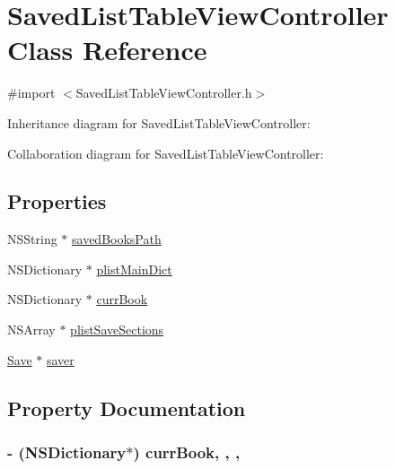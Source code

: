 \hypertarget{interface_saved_list_table_view_controller}{}\section{Saved\+List\+Table\+View\+Controller Class Reference}
\label{interface_saved_list_table_view_controller}


{\ttfamily \#import $<$Saved\+List\+Table\+View\+Controller.\+h$>$}



Inheritance diagram for Saved\+List\+Table\+View\+Controller\+:


Collaboration diagram for Saved\+List\+Table\+View\+Controller\+:
\subsection*{Properties}
\begin{DoxyCompactItemize}
\item 
N\+S\+String $\ast$ \hyperlink{interface_saved_list_table_view_controller_a09a8915cb1823999764e52dfa661234c}{saved\+Books\+Path}
\item 
N\+S\+Dictionary $\ast$ \hyperlink{interface_saved_list_table_view_controller_a690c66541215851f8153757315f92dc6}{plist\+Main\+Dict}
\item 
N\+S\+Dictionary $\ast$ \hyperlink{interface_saved_list_table_view_controller_a9267936e6cbedae16a93f64b2f37912a}{curr\+Book}
\item 
N\+S\+Array $\ast$ \hyperlink{interface_saved_list_table_view_controller_a15911e64ef5023fe4f278081bcb5c7db}{plist\+Save\+Sections}
\item 
\hyperlink{interface_save}{Save} $\ast$ \hyperlink{interface_saved_list_table_view_controller_a666694532f2b5c88a4a74a7c4fff5fe2}{saver}
\end{DoxyCompactItemize}


\subsection{Property Documentation}
\hypertarget{interface_saved_list_table_view_controller_a9267936e6cbedae16a93f64b2f37912a}{}
\subsubsection[{curr\+Book}]{\setlength{\rightskip}{0pt plus 5cm}-\/ (N\+S\+Dictionary$\ast$) curr\+Book\hspace{0.3cm}{\ttfamily [read]}, {\ttfamily [write]}, {\ttfamily [nonatomic]}, {\ttfamily [strong]}}\label{interface_saved_list_table_view_controller_a9267936e6cbedae16a93f64b2f37912a}
\hypertarget{interface_saved_list_table_view_controller_a690c66541215851f8153757315f92dc6}{}

